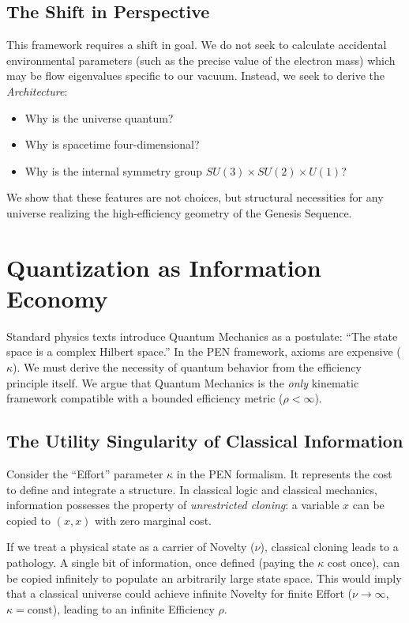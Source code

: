 \documentclass[12pt,a4paper]{article}
\theoremstyle{definition}
\newcommand{\kap}{\kappa}
\newcommand{\SM}{SU(3) \times SU(2) \times U(1)}
\begin{document}
\subsection{The Shift in Perspective}

This framework requires a shift in goal. We do not seek to calculate accidental environmental parameters (such as the precise value of the electron mass) which may be flow eigenvalues specific to our vacuum. Instead, we seek to derive the \emph{Architecture}:
\begin{itemize}[leftmargin=2em]
    \item Why is the universe quantum?
    \item Why is spacetime four-dimensional?
    \item Why is the internal symmetry group $\SM$?
\end{itemize}
We show that these features are not choices, but structural necessities for any universe realizing the high-efficiency geometry of the Genesis Sequence.

\section{Quantization as Information Economy}

Standard physics texts introduce Quantum Mechanics as a postulate: ``The state space is a complex Hilbert space.'' In the PEN framework, axioms are expensive ($\kap$). We must derive the necessity of quantum behavior from the efficiency principle itself. We argue that Quantum Mechanics is the \emph{only} kinematic framework compatible with a bounded efficiency metric ($\rho < \infty$).

\subsection{The Utility Singularity of Classical Information}

Consider the ``Effort'' parameter $\kap$ in the PEN formalism. It represents the cost to define and integrate a structure. In classical logic and classical mechanics, information possesses the property of \emph{unrestricted cloning}: a variable $x$ can be copied to $(x, x)$ with zero marginal cost.

If we treat a physical state as a carrier of Novelty ($\nu$), classical cloning leads to a pathology. A single bit of information, once defined (paying the $\kap$ cost once), can be copied infinitely to populate an arbitrarily large state space. This would imply that a classical universe could achieve infinite Novelty for finite Effort ($\nu \to \infty$, $\kap = \text{const}$), leading to an infinite Efficiency $\rho$.
\end{document}
